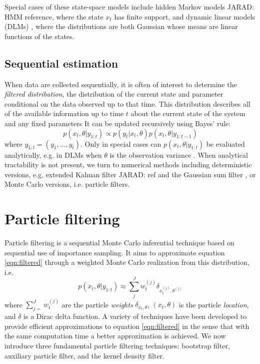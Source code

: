 \documentclass{article}
\newcommand{\jarad}[1]{{\color{red}JARAD: #1}}
\begin{document}
Special cases of these state-space models include hidden Markov models \jarad{HMM reference}, where the state $x_t$ has finite support, and dynamic linear models (DLMs) \citep{West:Harr:baye:1997}, where the distributions are both Gaussian whose means are linear functions of the states. 

\subsection{Sequential estimation}

When data are collected sequentially, it is often of interest to determine the \emph{filtered distribution}, the distribution of the current state and parameter conditional on the data observed up to that time. This distribution describes all of the available information up to time $t$ about the current state of the system and any fixed parameters It can be updated recursively using Bayes' rule:
\begin{equation} 
p(x_t,\theta| y_{1:t}) \propto p(y_t|x_t,\theta)p(x_t,\theta|y_{1:t-1}) \label{eqn:filtered}
\end{equation}
where $y_{1:t} = (y_1,\ldots,y_t)$. Only in special cases can $p(x_t,\theta| y_{1:t})$ be evaluated analytically, e.g. in DLMs when $\theta$ is the observation variance \cite[Sec 4.3,][]{petris2009dynamic}. When analytical tractability is not present, we turn to numerical methods including deterministic versions, e.g. extended Kalman filter \jarad{ref} and the Gaussian sum filter \citep{Alsp:Sore:nonl:1972}, or Monte Carlo versions, i.e. particle filters. 




\section{Particle filtering \label{sec:filtering}}

Particle filtering is a sequential Monte Carlo inferential technique based on sequential use of importance sampling. It aims to approximate equation \eqref{eqn:filtered} through a weighted Monte Carlo realization from this distribution, i.e.
\begin{equation}
p(x_t,\theta| y_{1:t}) \approx \sum_{j}^J w_t^{(j)} \delta_{x_t^{(j)},\theta^{(j)}}
\end{equation}
where $\sum_{j=}^J w_t^{(j)}$ are the particle \emph{weights} $\delta_{x_t,\theta}$, $(x_t,\theta)$ is the particle \emph{location}, and $\delta$ is a Dirac delta function. A variety of techniques have been developed to provide efficient approximations to equation \eqref{eqn:filtered} in the sense that with the same computation time a better approximation is achieved. We now introduce three fundamental particle filtering techniques: bootstrap filter, auxiliary particle filter, and the kernel density filter.
\end{document}
